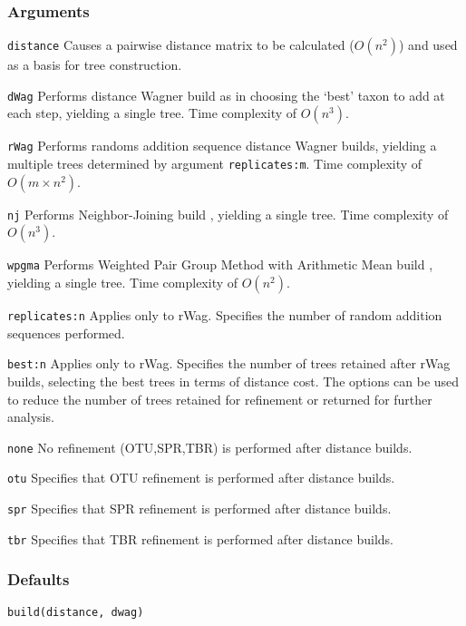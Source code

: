 \documentclass[11pt]{article}
\begin{document}
		\subsubsection{Arguments}
		\texttt{distance} Causes a pairwise distance matrix to be calculated ($O(n^2)$) and used as a basis for tree construction.
		
		\noindent \texttt{dWag} Performs distance Wagner build as in \citep{Farris1972} choosing the `best' taxon to add at each step, 
		yielding a single tree.  Time complexity of $O(n^3)$.
		
		\smallskip
		\noindent \texttt{rWag} Performs randoms addition sequence distance Wagner builds, yielding a multiple trees determined 
		by argument \texttt{replicates:m}.  Time complexity of $O(m \times n^2)$.
		
		\smallskip		
		\noindent \texttt{nj} Performs Neighbor-Joining build \citep{Saitou1987}, yielding a single tree.  Time complexity of $O(n^3)$.
		
		\smallskip		
		\noindent \texttt{wpgma} Performs Weighted Pair Group Method with Arithmetic Mean build \citep{SokalandMichener1958}, 
		yielding a single tree.  Time complexity of $O(n^2)$.
		
		\smallskip		
		\noindent \texttt{replicates:n}  Applies only to rWag.  Specifies the number of random addition sequences performed. 
		
		\smallskip		
		\noindent \texttt{best:n} Applies only to rWag.  Specifies the number of trees retained after rWag builds, selecting 
		the best trees in terms of distance cost.  The options can be used to reduce
		the number of trees retained for refinement or returned for further analysis.  
		
		\smallskip		
		\noindent \texttt{none} No refinement (OTU,SPR,TBR) is performed after distance builds.
		
		\smallskip		
		\noindent \texttt{otu} Specifies that OTU refinement \citep{Wheeler2021} is performed after distance builds.
		
		\smallskip		
		\noindent \texttt{spr} Specifies that SPR refinement \citep{Dayhoff1969} is performed after distance builds.

		\smallskip		
		\noindent \texttt{tbr} Specifies that TBR refinement \citep{Farris1988, swofford1990a} is performed after distance builds.

		\subsubsection{Defaults}
		\texttt{build(distance, dwag)}
\end{document}
